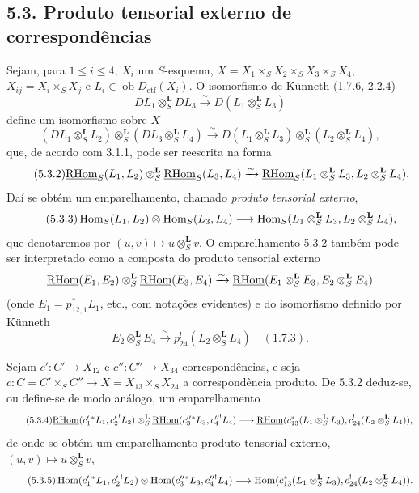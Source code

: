 \subsection*{5.3. Produto tensorial externo de correspondências}

Sejam, para $1\leq i\leq 4$, $X_i$ um $S$-esquema, $X=X_1\times_SX_2\times_SX_3\times_SX_4$, $X_{ij}=X_i\times_SX_j$ e $L_i\in\operatorname{ob}D_{\mathrm{ctf}}(X_i)$. O isomorfismo de Künneth (1.7.6, 2.2.4)
\[
DL_1\otimes_S^{\mathbf L}DL_3\xrightarrow{\sim}D(L_1\otimes_S^{\mathbf L}L_3)
\]
define um isomorfismo sobre $X$
\begin{equation}
\tag{5.3.1}
(DL_1\otimes_S^{\mathbf L}L_2)\otimes_S^{\mathbf L}(DL_3\otimes_S^{\mathbf L}L_4)
\xrightarrow{\sim}D(L_1\otimes_S^{\mathbf L}L_3)\otimes_S^{\mathbf L}(L_2\otimes_S^{\mathbf L}L_4),
\end{equation}
que, de acordo com 3.1.1, pode ser reescrita na forma
\begin{equation}
\tag{5.3.2}
\underline{\mathrm{RHom}}_S(L_1,L_2)\otimes_S^{\mathbf L}\underline{\mathrm{RHom}}_S(L_3,L_4)
\xrightarrow{\sim}\underline{\mathrm{RHom}}_S(L_1\otimes_S^{\mathbf L}L_3,L_2\otimes_S^{\mathbf L}L_4).
\end{equation}
Daí se obtém um emparelhamento, chamado \emph{produto tensorial externo},
\begin{equation}
\tag{5.3.3}
\operatorname{Hom}_S(L_1,L_2)\otimes\operatorname{Hom}_S(L_3,L_4)
\longrightarrow\operatorname{Hom}_S(L_1\otimes_S^{\mathbf L}L_3,L_2\otimes_S^{\mathbf L}L_4),
\end{equation}
que denotaremos por $(u,v)\mapsto u\otimes_S^{\mathbf L}v$. O emparelhamento 5.3.2 também pode ser interpretado como a composta do produto tensorial externo
\[
\underline{\mathrm{RHom}}(E_1,E_2)\otimes_S^{\mathbf L}\underline{\mathrm{RHom}}(E_3,E_4)
\xrightarrow{\sim}\underline{\mathrm{RHom}}(E_1\otimes_S^{\mathbf L}E_3,E_2\otimes_S^{\mathbf L}E_4)
\]
(onde $E_1=p_{12,1}^*L_1$, etc., com notações evidentes) e do isomorfismo definido por Künneth
\[
E_2\otimes_S^{\mathbf L}E_4\xrightarrow{\sim}p_{24}^!(L_2\otimes_S^{\mathbf L}L_4)\quad (1.7.3).
\]

Sejam $c':C'\to X_{12}$ e $c'':C''\to X_{34}$ correspondências, e seja $c:C=C'\times_SC''\to X=X_{13}\times_SX_{24}$ a correspondência produto. De 5.3.2 deduz-se, ou define-se de modo análogo, um emparelhamento
\begin{equation}
\tag{5.3.4}
\underline{\mathrm{RHom}}(c_1'{}^*L_1,c_2'{}^!L_2)\otimes_S^{\mathbf L}\underline{\mathrm{RHom}}(c_3''{}^*L_3,c_4''{}^!L_4)
\longrightarrow\underline{\mathrm{RHom}}(c_{13}^*(L_1\otimes_S^{\mathbf L}L_3),c_{24}^!(L_2\otimes_S^{\mathbf L}L_4)),
\end{equation}
de onde se obtém um emparelhamento produto tensorial externo, $(u,v)\mapsto u\otimes_S^{\mathbf L}v$,
\begin{equation}
\tag{5.3.5}
\operatorname{Hom}(c_1'{}^*L_1,c_2'{}^!L_2)\otimes\operatorname{Hom}(c_3''{}^*L_3,c_4''{}^!L_4)
\longrightarrow\operatorname{Hom}(c_{13}^*(L_1\otimes_S^{\mathbf L}L_3),c_{24}^!(L_2\otimes_S^{\mathbf L}L_4)).
\end{equation}

